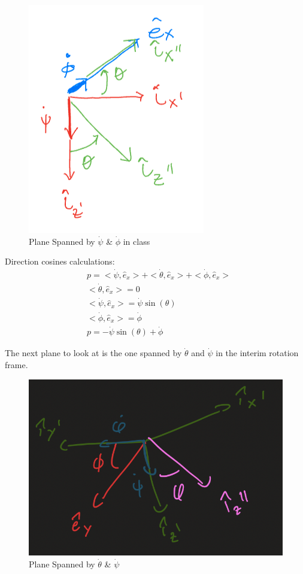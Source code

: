 \documentclass{article}
\begin{document}
\begin{figure}[H]
    \centering
    \includegraphics[width=0.8\linewidth]{plane_spanned_by_psi_phi.png}
    \caption{Plane Spanned by $\dot{\psi}$ \& $\dot{\phi}$ in class}
\end{figure}

Direction cosines calculations:
\begin{align*}
    & p = <\dot{\psi}, \hat{e}_x> + <\dot{\theta}, \hat{e}_x> + <\dot{\phi}, \hat{e}_x> \\
    & <\dot{\theta}, \hat{e}_x> = 0 \\
    & <\dot{\psi}, \hat{e}_x> = \dot{\psi} \sin(\theta) \\
    & <\dot{\phi}, \hat{e}_x> = \dot{\phi} \\
    & p = -\dot{\psi} \sin(\theta) + \dot{\phi}
\end{align*}

The next plane to look at is the one spanned by $\dot{\theta}$ and $\dot{\psi}$ in the interim rotation frame.

\begin{figure}[H]
    \centering
    \includegraphics[width=0.8\linewidth]{plane_spanned_by_theta_psi.png}
    \caption{Plane Spanned by $\dot{\theta}$ \& $\dot{\psi}$}
\end{figure}
\end{document}
